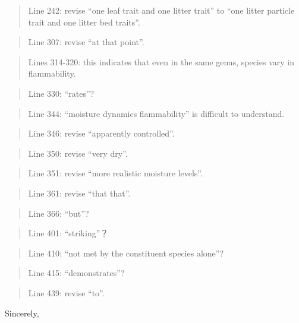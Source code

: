 \documentclass[letterpaper, 12pt]{letter}
\begin{document}
\begin{letter}{}
\begin{quote}
Line 242: revise “one leaf trait and one litter trait” to “one litter particle trait and one litter bed traits”.
\end{quote}

\begin{quote}
Line 307: revise “at that point”.
\end{quote}

\begin{quote}
Lines 314-320: this indicates that even in the same genus, species vary in flammability.
\end{quote}

\begin{quote}
Line 330: “rates”?
\end{quote}

\begin{quote}
Line 344: “moisture dynamics flammability” is difficult to understand.
\end{quote}

\begin{quote}
Line 346: revise “apparently controlled”.
\end{quote}

\begin{quote}
Line 350: revise “very dry”.
\end{quote}

\begin{quote}
Line 351: revise “more realistic moisture levels”.
\end{quote}

\begin{quote}
Line 361: revise “that that”.
\end{quote}

\begin{quote}
Line 366: “but”?
\end{quote}

\begin{quote}
Line 401: “striking”？
\end{quote}

\begin{quote}
Line 410: “not met by the constituent species alone”?
\end{quote}

\begin{quote}
Line 415: “demonstrates”?
\end{quote}

\begin{quote}
Line 439: revise “to”.
\end{quote}

\closing{Sincerely,}

\end{letter}
\end{document}
